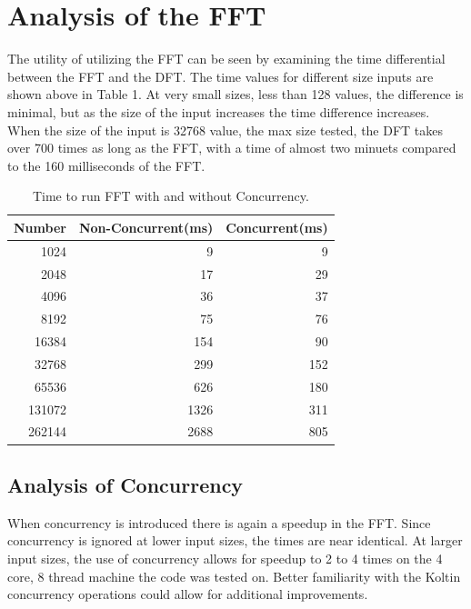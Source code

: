 \documentclass[sigconf]{acmart}
\begin{document}
\section{Analysis of the FFT}
The utility of utilizing the FFT can be seen by examining the time differential between the FFT and the DFT. The time values for different size inputs are shown above in Table 1. At very small sizes, less than 128 values, the difference is minimal, but as the size of the input increases the time difference increases. When the size of the input is 32768 value, the max size tested, the DFT takes over 700 times as long as the FFT, with a time of almost two minuets compared to the 160 milliseconds of the FFT.
\begin{table}
  \caption{Time to run FFT with and without Concurrency.}
  \label{tab:dtf}
  \begin{tabular}{rrr}
    \toprule
    Number & Non-Concurrent(ms) & Concurrent(ms)\\
    \midrule
    1024 &  9 & 9\\
    2048 &  17 & 29\\
    4096 &  36 & 37\\
    8192 &  75 & 76\\
    16384 &  154 & 90\\
    32768 &  299 & 152\\
    65536 &  626 & 180\\
    131072 &  1326 & 311\\
    262144 &  2688 & 805\\
  \bottomrule
\end{tabular}
\end{table}
\subsection{Analysis of Concurrency}
When concurrency is introduced there is again a speedup in the FFT. Since concurrency is ignored at lower input sizes, the times are near identical. At larger input sizes, the use of concurrency allows for speedup to 2 to 4 times on the 4 core, 8 thread machine the code was tested on. Better familiarity with the Koltin concurrency operations could allow for additional improvements.
\end{document}
